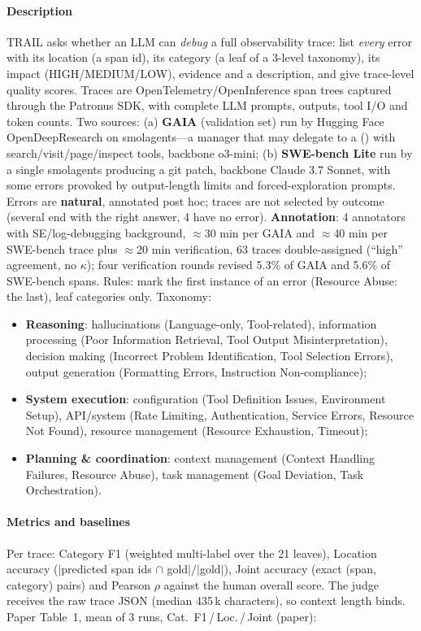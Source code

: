 \paragraph{Description} TRAIL asks whether an LLM can \emph{debug} a full observability trace: list \emph{every} error with its location (a span id), its category (a leaf of a 3-level taxonomy), its impact (HIGH/MEDIUM/LOW), evidence and a description, and give trace-level quality scores. Traces are OpenTelemetry/OpenInference span trees captured through the Patronus SDK, with complete LLM prompts, outputs, tool I/O and token counts. Two sources: (a) \textbf{GAIA} (validation set) run by Hugging Face OpenDeepResearch on smolagents---a manager  that may delegate to a  () with search/visit/page/inspect tools, backbone o3-mini; (b) \textbf{SWE-bench Lite} run by a single smolagents  producing a git patch, backbone Claude 3.7 Sonnet, with some errors provoked by output-length limits and forced-exploration prompts. Errors are \textbf{natural}, annotated post hoc; traces are not selected by outcome (several end with the right answer, 4 have no error). \textbf{Annotation}: 4 annotators with SE/log-debugging background, $\approx$30 min per GAIA and $\approx$40 min per SWE-bench trace plus $\approx$20 min verification, 63 traces double-assigned (``high'' agreement, no $\kappa$); four verification rounds revised 5.3\% of GAIA and 5.6\% of SWE-bench spans. Rules: mark the first instance of an error (Resource Abuse: the last), leaf categories only. Taxonomy:
\begin{itemize}
\item \textbf{Reasoning}: hallucinations (Language-only, Tool-related), information processing (Poor Information Retrieval, Tool Output Misinterpretation), decision making (Incorrect Problem Identification, Tool Selection Errors), output generation (Formatting Errors, Instruction Non-compliance);
\item \textbf{System execution}: configuration (Tool Definition Issues, Environment Setup), API/system (Rate Limiting, Authentication, Service Errors, Resource Not Found), resource management (Resource Exhaustion, Timeout);
\item \textbf{Planning \& coordination}: context management (Context Handling Failures, Resource Abuse), task management (Goal Deviation, Task Orchestration).
\end{itemize}

\paragraph{Metrics and baselines} Per trace: Category F1 (weighted multi-label over the 21 leaves), Location accuracy ($|$predicted span ids $\cap$ gold$|/|$gold$|$), Joint accuracy (exact (span, category) pairs) and Pearson $\rho$ against the human overall score. The judge receives the raw trace JSON (median 435\,k characters), so context length binds. Paper Table~1, mean of 3 runs, Cat.\ F1\,/\,Loc.\,/\,Joint (paper):

